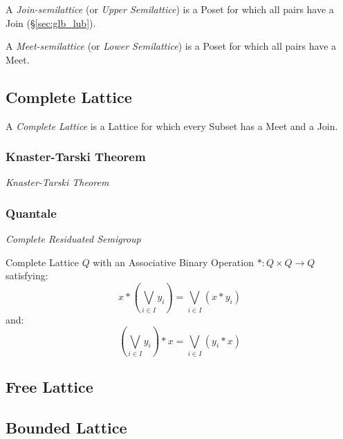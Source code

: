 A \emph{Join-semilattice} (or \emph{Upper Semilattice}) is a Poset for
which all pairs have a Join (\S\ref{sec:glb_lub}).

A \emph{Meet-semilattice} (or \emph{Lower Semilattice}) is a Poset for
which all pairs have a Meet.



\subsection{Complete Lattice}\label{sec:complete_lattice}

A \emph{Complete Lattice} is a Lattice for which every Subset has a
Meet and a Join.



\subsubsection{Knaster-Tarski Theorem}\label{sec:knaster_tarski}

\emph{Knaster-Tarski Theorem}



\subsubsection{Quantale}\label{sec:quantale}

\emph{Complete Residuated Semigroup}

Complete Lattice $Q$ with an Associative Binary Operation $* : Q
\times Q \rightarrow Q$ satisfying:
\[
  x*(\bigvee_{i \in I} y_i) = \bigvee_{i \in I}(x * y_i)
\]
and:
\[
  (\bigvee_{i \in I} y_i)*x = \bigvee_{i \in I}(y_i * x)
\]



\subsection{Free Lattice}\label{sec:free_lattice}

\subsection{Bounded Lattice}\label{sec:bounded_lattice}

